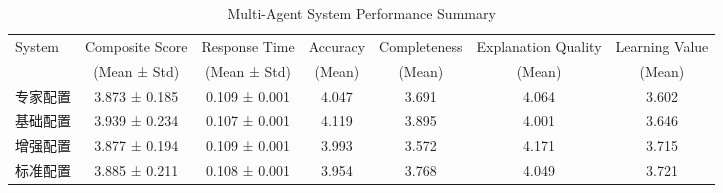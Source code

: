
\begin{table}[htbp]
\centering
\caption{Multi-Agent System Performance Summary}
\label{tab:performance_summary}
\begin{tabular}{lcccccc}
\toprule
System & Composite Score & Response Time & Accuracy & Completeness & Explanation Quality & Learning Value \\
& (Mean ± Std) & (Mean ± Std) & (Mean) & (Mean) & (Mean) & (Mean) \\
\midrule
专家配置 & 3.873 ± 0.185 & 0.109 ± 0.001 & 4.047 & 3.691 & 4.064 & 3.602 \\
基础配置 & 3.939 ± 0.234 & 0.107 ± 0.001 & 4.119 & 3.895 & 4.001 & 3.646 \\
增强配置 & 3.877 ± 0.194 & 0.109 ± 0.001 & 3.993 & 3.572 & 4.171 & 3.715 \\
标准配置 & 3.885 ± 0.211 & 0.108 ± 0.001 & 3.954 & 3.768 & 4.049 & 3.721 \\

\bottomrule
\end{tabular}
\end{table}
